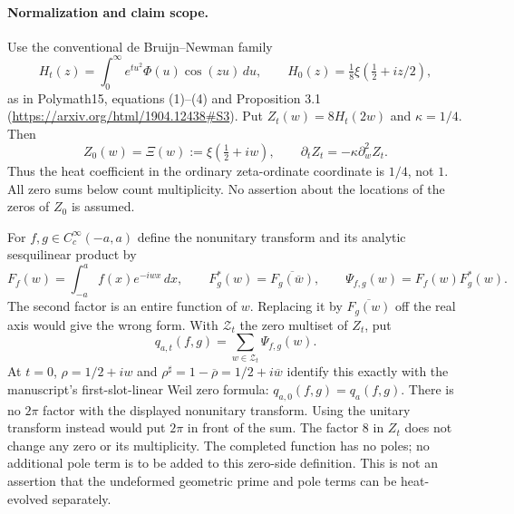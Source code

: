 \documentclass[11pt]{article}
\theoremstyle{remark}
\begin{document}
\paragraph{Normalization and claim scope.}
Use the conventional de Bruijn--Newman family
\[
 H_t(z)=\int_0^\infty e^{tu^2}\Phi(u)\cos(zu)\,du,
 \qquad H_0(z)=\tfrac18\xi(\tfrac12+iz/2),
\]
as in Polymath15, equations (1)--(4) and Proposition 3.1
(\url{https://arxiv.org/html/1904.12438#S3}).
Put $Z_t(w)=8H_t(2w)$ and $\kappa=1/4$. Then
\begin{equation}\label{eq:ns52-normalization}
 Z_0(w)=\Xi(w):=\xi(\tfrac12+iw),\qquad
 \partial_t Z_t=-\kappa\partial_w^2 Z_t.
\end{equation}
Thus the heat coefficient in the ordinary zeta-ordinate coordinate is
$1/4$, not $1$. All zero sums below count multiplicity. No assertion
about the locations of the zeros of $Z_0$ is assumed.

For $f,g\in C_c^\infty(-a,a)$ define the nonunitary transform and
its analytic sesquilinear product by
\[
 F_f(w)=\int_{-a}^a f(x)e^{-iwx}\,dx,\qquad
 F_g^*(w)=\overline{F_g(\overline w)},\qquad
 \Psi_{f,g}(w)=F_f(w)F_g^*(w).
\]
The second factor is an entire function of $w$. Replacing it by
$\overline{F_g(w)}$ off the real axis would give the wrong form.
With $\mathcal Z_t$ the zero multiset of $Z_t$, put
\begin{equation}\label{eq:ns52-zero-form}
 q_{a,t}(f,g)=\sum_{w\in\mathcal Z_t}\Psi_{f,g}(w).
\end{equation}
At $t=0$, $\rho=1/2+iw$ and
$\rho^\sharp=1-\overline\rho=1/2+i\overline w$ identify this
exactly with the manuscript's first-slot-linear Weil zero formula:
$q_{a,0}(f,g)=q_a(f,g)$. There is no $2\pi$ factor with the
displayed nonunitary transform. Using the unitary transform instead
would put $2\pi$ in front of the sum. The factor $8$ in $Z_t$ does
not change any zero or its multiplicity. The completed function has
no poles; no additional pole term is to be added to this zero-side
definition. This is not an assertion that the undeformed geometric
prime and pole terms can be heat-evolved separately.
\end{document}
